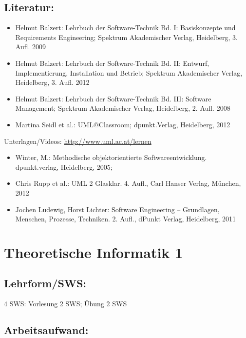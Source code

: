 \section*{Literatur:}\label{literatur-22}

\begin{itemize}
\item
  Helmut Balzert: Lehrbuch der Software-Technik Bd. I: Basiskonzepte und
  Requirements Engineering; Spektrum Akademischer Verlag, Heidelberg, 3.
  Aufl. 2009
\item
  Helmut Balzert: Lehrbuch der Software-Technik Bd. II: Entwurf,
  Implementierung, Installation und Betrieb; Spektrum Akademischer
  Verlag, Heidelberg, 3. Aufl. 2012
\item
  Helmut Balzert: Lehrbuch der Software-Technik Bd. III: Software
  Management; Spektrum Akademischer Verlag, Heidelberg, 2. Aufl. 2008
\item
  Martina Seidl et al.: UML@Classroom; dpunkt.Verlag, Heidelberg, 2012
\end{itemize}

Unterlagen/Videos: \url{http://www.uml.ac.at/lernen}

\begin{itemize}
\item
  Winter, M.: Methodische objektorientierte Softwareentwicklung.
  dpunkt.verlag, Heidelberg, 2005;
\item
  Chris Rupp et al.: UML 2 Glasklar. 4. Aufl., Carl Hanser Verlag,
  München, 2012
\item
  Jochen Ludewig, Horst Lichter: Software Engineering -- Grundlagen,
  Menschen, Prozesse, Techniken. 2. Aufl., dPunkt Verlag, Heidelberg,
  2011
\end{itemize}

\chapter{Theoretische Informatik 1}\label{theoretische-informatik-1}

\section*{Lehrform/SWS:}\label{lehrformsws-23}

4 SWS: Vorlesung 2 SWS; Übung 2 SWS

\section*{Arbeitsaufwand:}\label{arbeitsaufwand-19}

